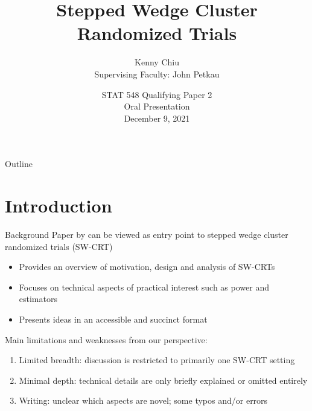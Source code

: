 \documentclass[9pt]{beamer}
\title{Stepped Wedge Cluster Randomized Trials}
\author[Kenny Chiu]{\large Kenny Chiu\\\vspace{0.5em} \footnotesize Supervising Faculty: John Petkau}
\institute[]{\footnotesize The University of British Columbia\\Department of Statistics}
\date[August 24, 2021]{\large STAT 548 Qualifying Paper 2\\\normalsize Oral Presentation\\\vspace{0.5em}\footnotesize December 9, 2021}
\begin{document}
\begin{frame}
\titlepage
\end{frame}



\begin{frame}{Outline}
\tableofcontents
\end{frame}


\section{Introduction}



\begin{frame}{Background}
Paper by \citet{Hussey:2007} can be viewed as entry point to stepped wedge cluster randomized trials (SW-CRT)
\begin{itemize}

\item
Provides an overview of motivation, design and analysis of SW-CRTs

\item
Focuses on technical aspects of practical interest such as power and estimators

\item
Presents ideas in an accessible and succinct format

\end{itemize}
\vspace{2em}

Main limitations and weaknesses from our perspective:
\begin{enumerate}

\item
Limited breadth: discussion is restricted to primarily one SW-CRT setting

\item
Minimal depth: technical details are only briefly explained or omitted entirely

\item
Writing: unclear which aspects are novel; some typos and/or errors

\end{enumerate}
\end{frame}
\end{document}
